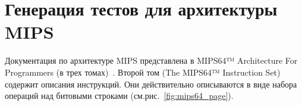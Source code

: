 
\section{Генерация тестов для архитектуры MIPS}


Документация по архитектуре MIPS представлена в MIPS64™ Architecture For Programmers (в трех томах)~\cite{mips64II, mips64III}. Второй том (The MIPS64™ Instruction Set) содержит описания инструкций. Они  действительно описываются в виде набора операций над битовыми строками (см.рис.~\ref{fig:mips64_page}).

